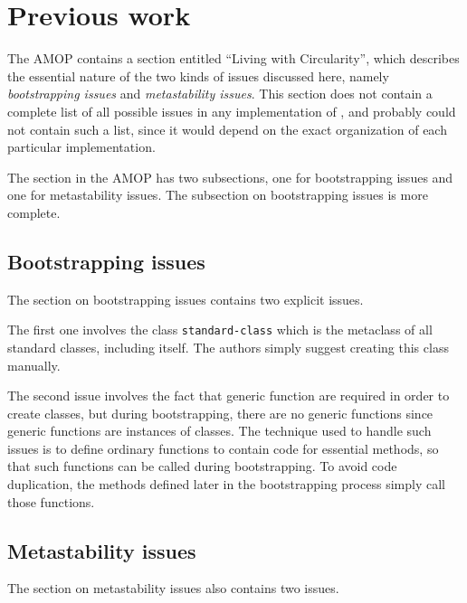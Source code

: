 \section{Previous work}

The AMOP \cite{Kiczales:1991:AMP:574212} contains a section entitled
``Living with Circularity'', which describes the essential nature of
the two kinds of issues discussed here, namely \emph{bootstrapping
  issues} and \emph{metastability issues}.  This section does not
contain a complete list of all possible issues in any implementation
of \clos{}, and probably could not contain such a list, since it would
depend on the exact organization of each particular implementation.

The section in the AMOP has two subsections, one for bootstrapping
issues and one for metastability issues.  The subsection on
bootstrapping issues is more complete.  

\subsection{Bootstrapping issues}

The section on bootstrapping issues contains two explicit issues.

The first one involves the class \texttt{standard-class} which is the
metaclass of all standard classes, including itself.  The authors
simply suggest creating this class manually.

The second issue involves the fact that generic function are required
in order to create classes, but during bootstrapping, there are no
generic functions since generic functions are instances of classes.
The technique used to handle such issues is to define ordinary
functions to contain code for essential methods, so that such
functions can be called during bootstrapping.  To avoid code
duplication, the methods defined later in the bootstrapping process
simply call those functions.  

\subsection{Metastability issues} 

The section on metastability issues also contains two issues.

